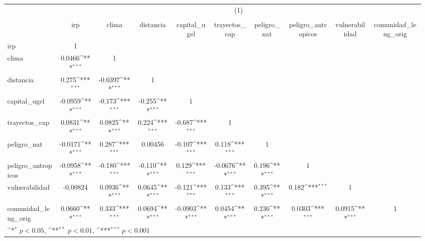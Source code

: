 {
\def\sym#1{\ifmmode^{#1}\else\(^{#1}\)\fi}
\begin{tabular}{l*{9}{c}}
\hline\hline
          &\multicolumn{9}{c}{(1)}                                                                                                                                                   \\
          &\multicolumn{9}{c}{}                                                                                                                                                      \\
          &      irp         &    clima         &distancia         &capital\_ugel         &trayectos\_cap         &peligro\_nat         &peligro\_antropicos         &vulnerabilidad         &comunidad\_leng\_orig         \\
\hline
irp       &        1         &                  &                  &                  &                  &                  &                  &                  &                  \\
clima     &   0.0466\sym{***}&        1         &                  &                  &                  &                  &                  &                  &                  \\
distancia &    0.275\sym{***}&  -0.0397\sym{***}&        1         &                  &                  &                  &                  &                  &                  \\
capital\_ugel&  -0.0959\sym{***}&   -0.173\sym{***}&   -0.255\sym{***}&        1         &                  &                  &                  &                  &                  \\
trayectos\_cap&   0.0831\sym{***}&   0.0825\sym{***}&    0.224\sym{***}&   -0.687\sym{***}&        1         &                  &                  &                  &                  \\
peligro\_nat&  -0.0171\sym{***}&    0.287\sym{***}&  0.00456         &   -0.107\sym{***}&    0.118\sym{***}&        1         &                  &                  &                  \\
peligro\_antropicos&  -0.0958\sym{***}&   -0.180\sym{***}&   -0.110\sym{***}&    0.129\sym{***}&  -0.0676\sym{***}&    0.196\sym{***}&        1         &                  &                  \\
vulnerabilidad& -0.00824         &   0.0936\sym{***}&   0.0645\sym{***}&   -0.121\sym{***}&    0.133\sym{***}&    0.395\sym{***}&    0.182\sym{***}&        1         &                  \\
comunidad\_leng\_orig&   0.0660\sym{***}&    0.333\sym{***}&   0.0694\sym{***}&  -0.0903\sym{***}&   0.0454\sym{***}&    0.236\sym{***}&   0.0303\sym{***}&   0.0915\sym{***}&        1         \\
\hline\hline
\multicolumn{10}{l}{\footnotesize \sym{*} \(p<0.05\), \sym{**} \(p<0.01\), \sym{***} \(p<0.001\)}\\
\end{tabular}
}
